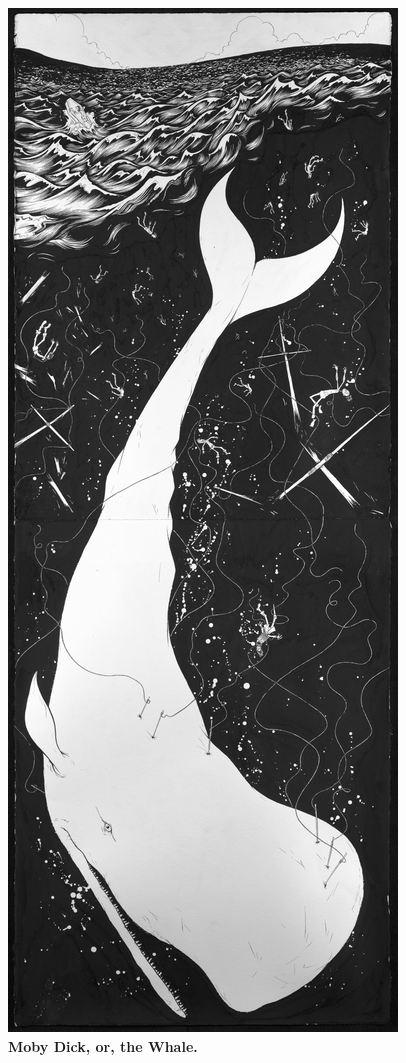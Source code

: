 \documentclass{article}
\begin{document}
\begin{figure}[!htp]
  \begin{center}
      \includegraphics{moby_dick_11}
    \caption{
        \textbf{Moby Dick, or, the Whale.}
}
\end{center}
\end{figure}
\end{document}
